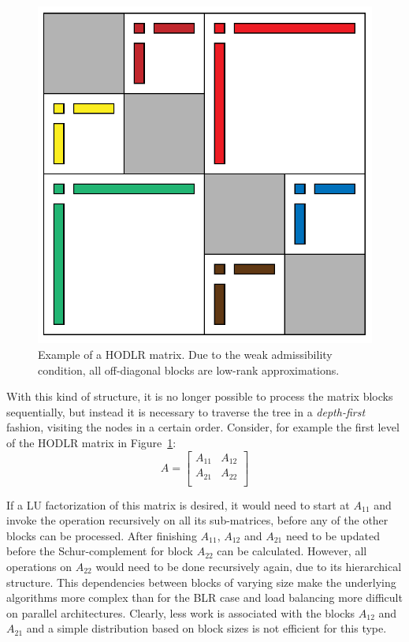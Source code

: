 \begin{figure}[h]
    \centering
    \includegraphics[width=0.6\linewidth]{chapters/4_hierarchical_matrices/figures/HODLR.pdf}
    \caption[Hierarchical Off-Diagonal Low-Rank Matrix]{Example of a HODLR matrix. Due to the weak admissibility condition, all off-diagonal blocks are low-rank approximations.}
    \label{fig:hodlr}
\end{figure}

With this kind of structure, it is no longer possible to process the matrix blocks sequentially, but instead it is necessary to traverse the tree in a \textit{depth-first} fashion, visiting the nodes in a certain order. Consider, for example the first level of the HODLR matrix in Figure~\hyperref[fig:hodlr]{\ref{fig:hodlr}}:
\begin{equation}
  A = 
  \left[
    \begin{array}{cc}
      A_{11}& A_{12} \\
      A_{21} & A_{22} \\
    \end{array}
  \right]
\end{equation}

\noindent If a LU factorization of this matrix is desired, it would need to start at $A_{11}$ and invoke the operation recursively on all its sub-matrices, before any of the other blocks can be processed. After finishing $A_{11}$, $A_{12}$ and $A_{21}$ need to be updated before the Schur-complement for block $A_{22}$ can be calculated. However, all operations on $A_{22}$ would need to be done recursively again, due to its hierarchical structure. This dependencies between blocks of varying size make the underlying algorithms more complex than for the BLR case and load balancing more difficult on parallel architectures. Clearly, less work is associated with the blocks $A_{12}$ and $A_{21}$ and a simple distribution based on block sizes is not efficient for this type.

